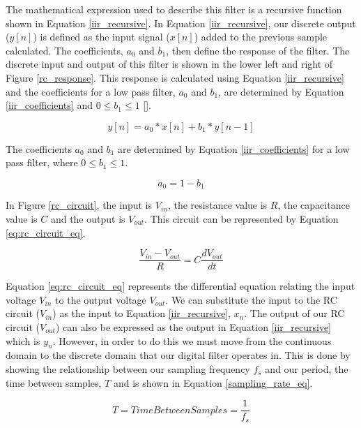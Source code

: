 The mathematical expression used to describe this filter is a recursive function shown in Equation \ref{iir_recursive}.  In Equation \ref{iir_recursive}, our discrete output ($y[n]$) is defined as the input signal ($x[n]$) added to the previous sample calculated.  The coefficients, $a_0$ and $b_1$, then define the response of the filter.  The discrete input and output of this filter is shown in the lower left and right of  Figure \ref{rc_response}.  This response is calculated using Equation \ref{iir_recursive} and the coefficients for a low pass filter, $a_0$ and $b_1$, are determined by Equation \ref{iir_coefficients} and $0 \leq b_1 \leq 1$ [\cite{smith1997scientist}].

\begin{equation}\label{iir_recursive}
y[n] = a_0 * x[n] + b_1 * y[n-1]
\end{equation}

The coefficients $a_0$ and $b_1$ are determined by Equation \ref{iir_coefficients} for a low pass filter, where $0 \leq b_1 \leq 1$.

\begin{equation}\label{iir_coefficients}
a_0 = 1 - b_1
\end{equation}

In Figure \ref{rc_circuit}, the input is $V_{in}$, the resistance value is $R$, the capacitance value is $C$ and the output is $V_{out}$.  This circuit can be represented by Equation \ref{eq:rc_circuit_eq}.

\begin{equation}\label{eq:rc_circuit_eq}
\frac{V_{in}-V_{out}}{R}=C\frac{dV_{out}}{dt}
\end{equation}

Equation \ref{eq:rc_circuit_eq} represents the differential equation relating the input voltage $V_{in}$ to the output voltage $V_{out}$.  We can substitute the input to the RC circuit ($V_{in}$) as the input to Equation \ref{iir_recursive}, $x_n$.  The output of our RC circuit ($V_{out}$) can also be expressed as the output in Equation \ref{iir_recursive} which is $y_n$.  However, in order to do this we must move from the continuous domain to the discrete domain that our digital filter operates in.  This is done by showing the relationship between our sampling frequency $f_s$ and our period, the time between samples, $T$ and is shown in Equation \ref{sampling_rate_eq}.

\begin{equation}\label{sampling_rate_eq}
T=Time Between Samples=\frac{1}{f_s}
\end{equation}

